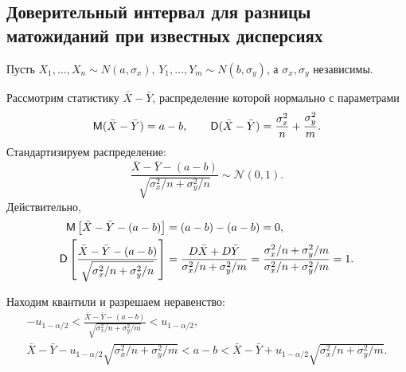 \subsection{Доверительный интервал для разницы матожиданий при известных дисперсиях}
\begin{ex}
Пусть $X_1, \dots, X_n \sim N(a, \sigma_x)$, $Y_1, \dots, Y_m \sim N(b,
\sigma_y)$, а $\sigma_x, \sigma_y$ независимы.

Рассмотрим статистику $ \bar X - \bar Y $, распределение которой нормально с
параметрами  
\[
		\mathsf M (\bar X - \bar Y) = a - b, \qquad \mathsf D(\bar X - \bar Y) =
		\frac{\sigma_x^2}{n} + \frac{\sigma_y^2}{m}.
\]
Стандартизируем распределение:
\[
  \frac{\bar X - \bar Y - (a-b)}{\sqrt{\sigma_x^2/n +
	\sigma_y^2/n}} \sim \mathscr N(0, 1).
\]
Действительно,
\begin{align*}
	\mathsf M\left[\bar X - \bar Y - \left(a-b\right)\right] &= (a-b) - (a-b) = 0, \\
  \mathsf D\left[\frac{\bar X - \bar Y - (a-b)}{\sqrt{\sigma_x^2/n +
\sigma_y^2/n}}\right] &= \frac{D \bar X + D \bar Y}{\sigma_x^2 / n +
\sigma_y^2 / m} = \frac{\sigma_x^2 / n + \sigma_y^2 / m}{\sigma_x^2 / n +
\sigma_y^2 / m} = 1.
\end{align*}

Находим квантили и разрешаем неравенство:
\begin{gather*}
  - u_{1-\alpha/2} < \frac{\bar X - \bar Y - (a-b)}{\sqrt{\sigma_x^2 / n +
	\sigma_y^2 / m}} < u_{1-\alpha/2}, \\
  \bar X - \bar Y - u_{1-\alpha/2} \sqrt{\sigma_x^2 / n + \sigma_y^2 / m}< a-b <
	\bar X - \bar Y + u_{1-\alpha/2} \sqrt{\sigma_x^2 / n + \sigma_y^2 / m}.
\end{gather*}
\end{ex}

